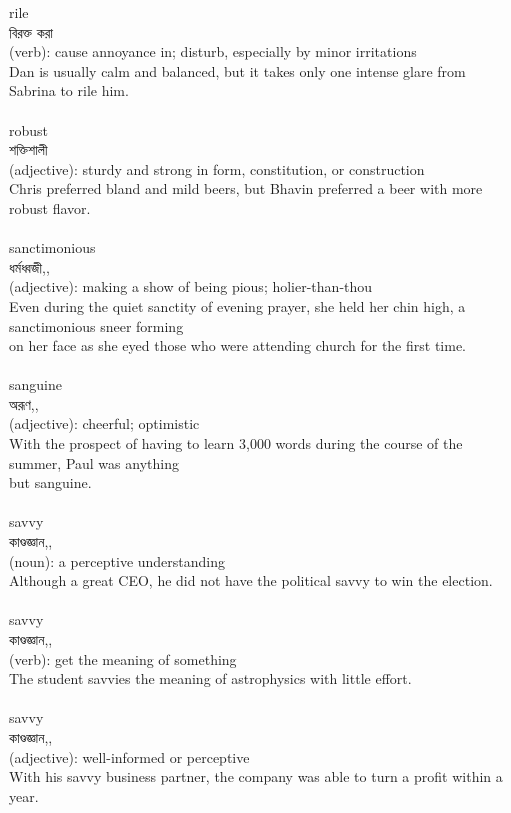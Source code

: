 \documentclass{article}
\begin{document}
{rile}\\
{বিরক্ত করা}\\
{(verb): cause annoyance in; disturb, especially by minor irritations\\Dan is usually calm and balanced, but it takes only one intense glare from Sabrina to rile him.\\}\\
{robust}\\
{শক্তিশালী}\\
{(adjective): sturdy and strong in form, constitution, or construction\\Chris preferred bland and mild beers, but Bhavin preferred a beer with more robust flavor.\\}\\
{sanctimonious}\\
{ধর্মধ্বজী,,}\\
{(adjective): making a show of being pious; holier-than-thou\\Even during the quiet sanctity of evening prayer, she held her chin high, a sanctimonious sneer forming\\on her face as she eyed those who were attending church for the first time.\\}\\
{sanguine}\\
{অরূণ,,}\\
{(adjective): cheerful; optimistic\\With the prospect of having to learn 3,000 words during the course of the summer, Paul was anything\\but sanguine.\\}\\
{savvy}\\
{কাণ্ডজ্ঞান,,}\\
{(noun): a perceptive understanding\\Although a great CEO, he did not have the political savvy to win the election.\\}\\
{savvy}\\
{কাণ্ডজ্ঞান,,}\\
{(verb): get the meaning of something\\The student savvies the meaning of astrophysics with little effort.\\}\\
{savvy}\\
{কাণ্ডজ্ঞান,,}\\
{(adjective): well-informed or perceptive\\With his savvy business partner, the company was able to turn a profit within a year.\\}\\
\end{document}
